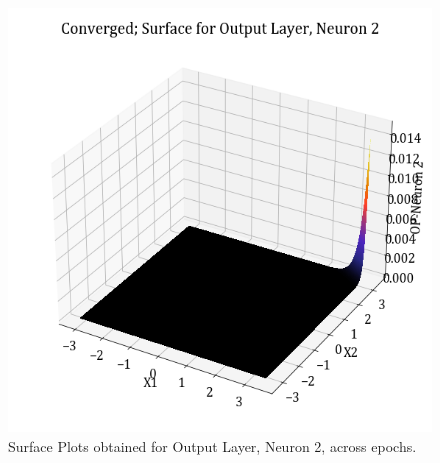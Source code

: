 \documentclass[11pt,a4paper]{article}
\begin{document}
\begin{figure}[H]
    \includegraphics[scale=0.4]{images/1B_MLFFNN_conv_OP_N2.png}
    \caption{Surface Plots obtained for Output Layer, Neuron 2, across epochs.}
\end{figure}
\end{document}

